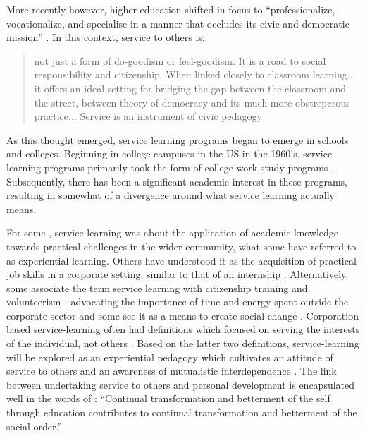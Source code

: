 More recently however, higher education shifted in focus to “professionalize, vocationalize, and specialise in a manner that occludes its civic and democratic mission” \citep[][pxi]{Barber1997}. In this context, service to others is:
\blockquote{not just a form of do-goodism or feel-goodism. It is a road to social responsibility and citizenship. When linked closely to classroom learning... it offers an ideal setting for bridging the gap between the classroom and the street, between theory of democracy and its much more obstreperous practice... Service is an instrument of civic pedagogy \citep[][pxiii]{Barber1997}}
As this thought emerged, service learning programs began to emerge in schools and colleges. 
Beginning in college campuses in the US in the 1960's, service learning programs primarily took the form of college work-study programs \citep{Karlberg2005}.
Subsequently, there has been a significant academic interest in these programs, resulting in somewhat of a divergence around what service learning actually means. 

For some \citep{Furco1996,Eyler1999}, service-learning was about the application of academic knowledge towards practical challenges in the wider community, what some have referred to as experiential learning. Others have understood it as the acquisition of practical job skills in a corporate setting, similar to that of an internship \citep{Colby2003}. Alternatively, some associate the term service learning with citizenship training and volunteerism - advocating the importance of time and energy spent outside the corporate sector \citep{GilesJnr1994, Smith1994a} and some see it as a means to create social change \citep{Pollock1999}. Corporation based service-learning often had definitions which focused on serving the interests of the individual, not others 
\citep{Karlberg2005}. Based on the latter two definitions, service-learning will be explored as an experiential pedagogy which cultivates an attitude of service to others and an awareness of mutualistic interdependence \citep{Karlberg2005}. 
The link between undertaking service to others and personal development is encapsulated well in the words of \citet[][]{Biccum2016}: “Continual transformation and betterment of the self through education contributes to continual transformation and betterment of the social order.”



